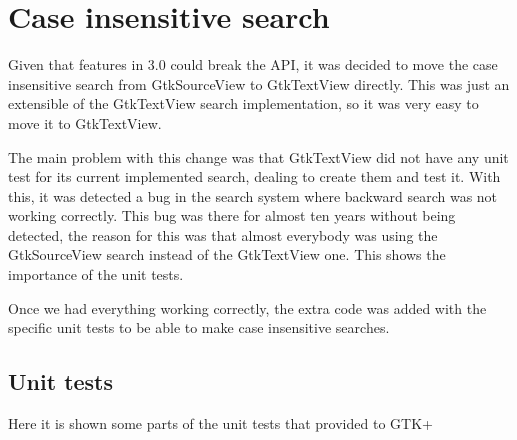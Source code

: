 \newpage
\section{Case insensitive search}

Given that features in 3.0 could break the API, it was decided to move the case 
insensitive search from GtkSourceView to GtkTextView directly. This was just an 
extensible of the GtkTextView search implementation, so it was very easy to move 
it to GtkTextView.

The main problem with this change  was that GtkTextView did not have any unit test 
for its current implemented search, dealing to create them and test it.   With this, 
it was detected a bug in the search system where backward search was not working correctly. 
This bug was there for almost ten years without being detected, the reason for this was that 
almost everybody was using the GtkSourceView search instead of the GtkTextView one. 
This shows the importance of the unit tests.

Once we had everything working correctly, the extra code was added with the specific 
unit tests to be able to make case insensitive searches.

\subsection{Unit tests}

Here it is shown some parts of the unit tests that provided to GTK+

